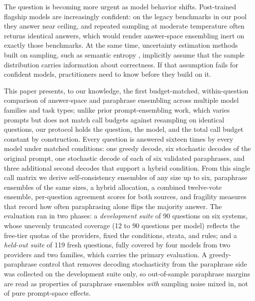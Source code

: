The question is becoming more urgent as model behavior shifts. Post-trained flagship models are increasingly confident: on the legacy benchmarks in our pool they answer near ceiling, and repeated sampling at moderate temperature often returns identical answers, which would render answer-space ensembling inert on exactly those benchmarks. At the same time, uncertainty estimation methods built on sampling, such as semantic entropy \citep{kuhn2023semantic,farquhar2024detecting}, implicitly assume that the sample distribution carries information about correctness. If that assumption fails for confident models, practitioners need to know before they build on it.

This paper presents, to our knowledge, the first budget-matched, within-question comparison of answer-space and paraphrase ensembling across multiple model families and task types; unlike prior prompt-ensembling work, which varies prompts but does not match call budgets against resampling on identical questions, our protocol holds the question, the model, and the total call budget constant by construction. Every question is answered sixteen times by every model under matched conditions: one greedy decode, six stochastic decodes of the original prompt, one stochastic decode of each of six validated paraphrases, and three additional second decodes that support a hybrid condition. From this single call matrix we derive self-consistency ensembles of any size up to six, paraphrase ensembles of the same sizes, a hybrid allocation, a combined twelve-vote ensemble, per-question agreement scores for both sources, and fragility measures that record how often paraphrasing alone flips the majority answer. The evaluation ran in two phases: a \emph{development suite} of 90 questions on six systems, whose unevenly truncated coverage (12 to 90 questions per model) reflects the free-tier quotas of the providers, fixed the conditions, strata, and rules; and a \emph{held-out suite} of 119 fresh questions, fully covered by four models from two providers and two families, which carries the primary evaluation. A greedy-paraphrase control that removes decoding stochasticity from the paraphrase side was collected on the development suite only, so out-of-sample paraphrase margins are read as properties of paraphrase ensembles \emph{with} sampling noise mixed in, not of pure prompt-space effects.

